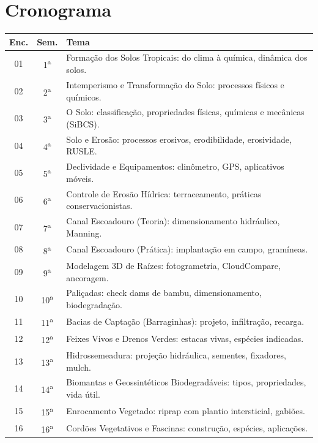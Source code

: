 \documentclass[11pt,a4paper]{article}
\begin{document}
\section*{Cronograma}


\begin{small}
\renewcommand{\arraystretch}{1.35}
\begin{tabularx}{\textwidth}{@{}c c X@{}}
\toprule
\textbf{Enc.} & \textbf{Sem.} & \textbf{Tema} \\
\midrule
01 & 1\textsuperscript{a} & Formação dos Solos Tropicais: do clima à química, dinâmica dos solos. \\
02 & 2\textsuperscript{a} & Intemperismo e Transformação do Solo: processos físicos e químicos. \\
03 & 3\textsuperscript{a} & O Solo: classificação, propriedades físicas, químicas e mecânicas (SiBCS). \\
04 & 4\textsuperscript{a} & Solo e Erosão: processos erosivos, erodibilidade, erosividade, RUSLE. \\
05 & 5\textsuperscript{a} & Declividade e Equipamentos: clinômetro, GPS, aplicativos móveis. \\
06 & 6\textsuperscript{a} & Controle de Erosão Hídrica: terraceamento, práticas conservacionistas. \\
07 & 7\textsuperscript{a} & Canal Escoadouro (Teoria): dimensionamento hidráulico, Manning. \\
08 & 8\textsuperscript{a} & Canal Escoadouro (Prática): implantação em campo, gramíneas. \\
09 & 9\textsuperscript{a} & Modelagem 3D de Raízes: fotogrametria, CloudCompare, ancoragem. \\
10 & 10\textsuperscript{a} & Paliçadas: check dams de bambu, dimensionamento, biodegradação. \\
11 & 11\textsuperscript{a} & Bacias de Captação (Barraginhas): projeto, infiltração, recarga. \\
12 & 12\textsuperscript{a} & Feixes Vivos e Drenos Verdes: estacas vivas, espécies indicadas. \\
13 & 13\textsuperscript{a} & Hidrossemeadura: projeção hidráulica, sementes, fixadores, mulch. \\
14 & 14\textsuperscript{a} & Biomantas e Geossintéticos Biodegradáveis: tipos, propriedades, vida útil. \\
15 & 15\textsuperscript{a} & Enrocamento Vegetado: riprap com plantio intersticial, gabiões. \\
16 & 16\textsuperscript{a} & Cordões Vegetativos e Fascinas: construção, espécies, aplicações. \\

\end{tabularx}
\end{small}
\end{document}
